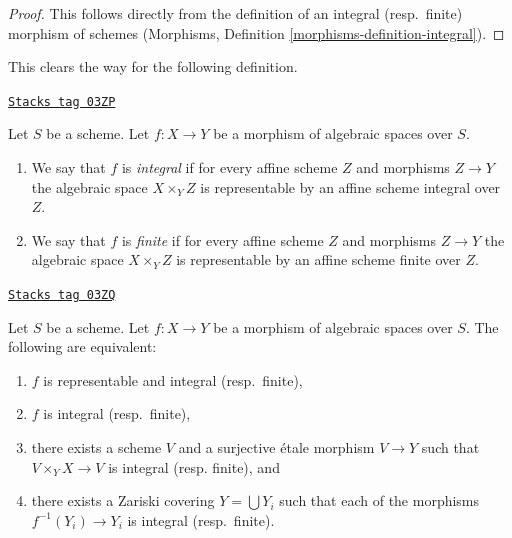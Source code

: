 \begin{proof}
This follows directly from the definition of an integral (resp.\ finite)
morphism of schemes
(Morphisms, Definition \ref{morphisms-definition-integral}).
\end{proof}

This clears the way for the following definition.

\begin{definition}[Integral]
\label{spaces-morphisms-definition-integral}
\href{https://stacks.math.columbia.edu/tag/03ZP}{\texttt{Stacks tag 03ZP}}

Let $S$ be a scheme.
Let $f : X \to Y$ be a morphism of algebraic spaces over $S$.
\begin{enumerate}
\item We say that $f$ is {\it integral} if for every affine scheme $Z$
and morphisms $Z \to Y$ the algebraic space $X \times_Y Z$ is
representable by an affine scheme integral over $Z$.
\item We say that $f$ is {\it finite} if for every affine scheme $Z$
and morphisms $Z \to Y$ the algebraic space $X \times_Y Z$ is
representable by an affine scheme finite over $Z$.
\end{enumerate}
\end{definition}

\begin{lemma}
\label{spaces-morphisms-lemma-integral-local}
\href{https://stacks.math.columbia.edu/tag/03ZQ}{\texttt{Stacks tag 03ZQ}}

Let $S$ be a scheme.
Let $f : X \to Y$ be a morphism of algebraic spaces over $S$.
The following are equivalent:
\begin{enumerate}
\item $f$ is representable and integral (resp.\ finite),
\item $f$ is integral (resp.\ finite),
\item there exists a scheme $V$ and a surjective \'etale morphism
$V \to Y$ such that $V \times_Y X \to V$ is integral (resp. finite), and
\item there exists a Zariski covering $Y = \bigcup Y_i$ such that
each of the morphisms $f^{-1}(Y_i) \to Y_i$ is integral (resp.\ finite).
\end{enumerate}
\end{lemma}

